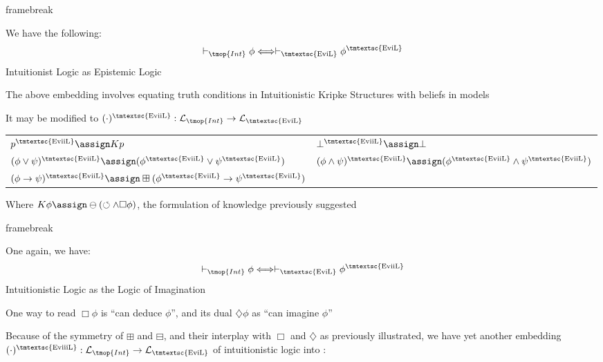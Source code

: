 framebreak

We have the following:
\[ \vdash_{\tmop{Int}} \phi \Longleftrightarrow
   \vdash_{\text{\tmtextsc{EviL}}} \phi^{\text{\tmtextsc{EviL}}} \]
Intuitionist Logic as  Epistemic Logic

The above embedding involves equating truth conditions in Intuitionistic
Kripke Structures with beliefs in  models

It may be modified to $(\cdot)^{\text{\tmtextsc{EviiL}}} :
\text{$\mathcal{L}_{\tmop{Int}}$} \rightarrow
\mathcal{L}_{\text{\tmtextsc{EviL}}}$

\begin{center}
  \begin{tabular}{ll}
    $p^{\text{\tmtextsc{EviiL}}} \assign K p$ &
    $\bot^{\text{\tmtextsc{EviiL}}} \assign \bot$\\
    $(\phi \vee \psi)^{\text{\tmtextsc{EviiL}}} \assign
    (\phi^{\text{\tmtextsc{EviiL}}} \vee \psi^{\text{\tmtextsc{EviiL}}})^{}$ &
    $(\phi \wedge \psi)^{\text{\tmtextsc{EviiL}}} \assign
    (\phi^{\text{\tmtextsc{EviiL}}} \wedge
    \psi^{\text{\tmtextsc{EviiL}}})^{}$\\
    $(\phi \rightarrow \psi)^{\text{\tmtextsc{EviiL}}} \assign \boxplus
    (\phi^{\text{\tmtextsc{EviiL}}} \rightarrow
    \psi^{\text{\tmtextsc{EviiL}}})$ & 
  \end{tabular}
\end{center}

Where $K \phi \assign \ominus (\circlearrowleft \wedge \Box  \phi)$, the
formulation of knowledge previously suggested

framebreak

One again, we have:
\[ \vdash_{\tmop{Int}} \phi \Longleftrightarrow
   \vdash_{\text{\tmtextsc{EviL}}} \phi^{\text{\tmtextsc{EviiL}}} \]
Intuitionistic Logic as the Logic of Imagination

One way to read $\Box  \phi$ is ``can deduce $\phi$'', and its dual
$\diamondsuit \phi$ as ``can imagine $\phi$''

Because of the symmetry of $\boxplus$ and $\boxminus$, and their interplay
with $\Box $ and $\diamondsuit$ as previously illustrated, we have yet another
embedding $(\cdot)^{\text{\tmtextsc{EviiiL}}} :
\text{$\mathcal{L}_{\tmop{Int}}$} \rightarrow
\mathcal{L}_{\text{\tmtextsc{EviL}}}$ of intuitionistic logic into
:

